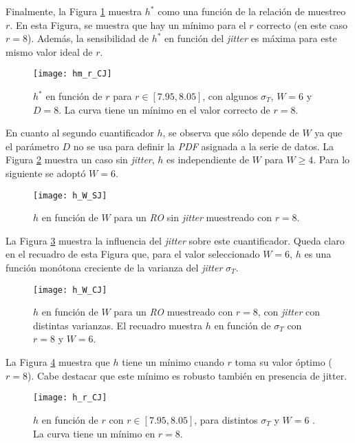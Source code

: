 Finalmente, la Figura \ref{fig:hm_r_CJ} muestra $h^*$ como una función de la relación de muestreo $r$.
En esta Figura, se muestra que hay un mínimo para el $r$ correcto (en este caso $r = 8$).
Además, la sensibilidad de $h^*$ en función del \textit{jitter} es máxima para este mismo valor ideal de $r$.
%
\begin{figure}
\centering
\texttt{[image: hm\_r\_CJ]}
\caption{$h^*$ en función de $r$ para $r\in[7.95,8.05]$, con algunos $\sigma_T$, $W=6$ y $D=8$. La curva tiene un mínimo en el valor correcto de $r=8$.}
\label{fig:hm_r_CJ}
\end{figure}

En cuanto al segundo cuantificador $h$, se observa que sólo depende de $W$ ya que el parámetro $ D $ no se usa para definir la \emph{PDF} asignada a la serie de datos.
La Figura \ref{fig:h_W_SJ} muestra un caso sin \textit{jitter}, $h$ es independiente de $W$ para $W \ge 4$.
Para lo siguiente se adoptó $W = 6$.
%
\begin{figure}
	\centering
	\texttt{[image: h\_W\_SJ]}
	\caption{$h$ en función de $W$ para un \emph{RO} sin \textit{jitter} muestreado con $r=8$.}
	\label{fig:h_W_SJ}
\end{figure}

La Figura \ref{fig:h_W_CJ} muestra la influencia del \textit{jitter} sobre este cuantificador.
Queda claro en el recuadro de esta Figura que, para el valor seleccionado $W = 6$, $h$ es una función monótona creciente de la varianza del \textit{jitter} $\sigma_T$.
%
\begin{figure}
	\centering
	\texttt{[image: h\_W\_CJ]}
	\caption{$h$ en función de $W$ para un \emph{RO} muestreado con $r=8$, con \textit{jitter} con distintas varianzas. El recuadro muestra $h$ en función de $\sigma_T$ con $r=8$ y $W=6$.}
	\label{fig:h_W_CJ}
\end{figure}

La Figura \ref{fig:h_r_CJ} muestra que $h$ tiene un mínimo cuando $r$ toma su valor óptimo ($r = 8$).
Cabe destacar que este mínimo es robusto también en presencia de jitter.
%
\begin{figure}
\centering
\texttt{[image: h\_r\_CJ]}
\caption{$h$ en función de $r$ con $r\in[7.95,8.05]$, para distintos $\sigma_T$ y $W=6$ . La curva tiene un mínimo en $r=8$.}
\label{fig:h_r_CJ}
\end{figure}

